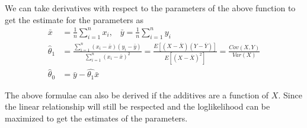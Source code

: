 \documentclass[../probability-notes.tex]{subfiles}
\begin{document}
    We can take derivatives with respect to the parameters of the above function to get the estimate for the parameters as
    \begin{align*}
        \bar{x} &= \frac{1}{n} \sum_{i=1}^{n} x_{i} \text{,}\quad \bar{y} = \frac{1}{n} \sum_{i=1}^{n} y_{i}\\
        \hat{\theta}_{1} &= \frac{\sum_{i=1}^{n} (x_{i} - \bar{x}) (y_{i} - \bar{y})}{\sum_{i=1}^{n}(x_{i} - \bar{x})^{2}} = \frac{E[(X-\overline{X})(Y-\overline{Y})]}{E[(X-\overline{X})^{2}]} = \frac{Cov(X,Y)}{Var(X)}\\
        \hat{\theta}_{0} &= \bar{y} - \hat{\theta_{1}} \bar{x}
    \end{align*}

    The above formulae can also be derived if the additives are a function of $X$. Since the linear relationship will still be respected and the loglikelihood can be maximized to get the estimates of the parameters.\newline

\end{document}
